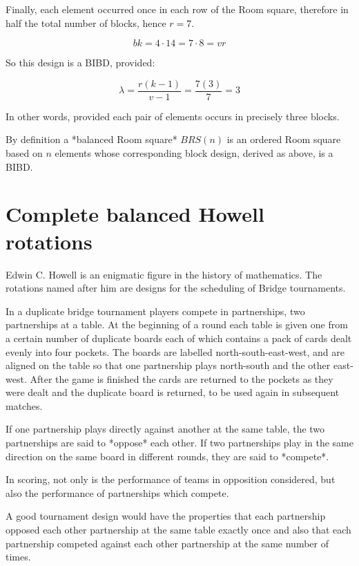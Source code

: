 \documentclass[
  11pt,
  a4paper]{book}\usepackage[]{graphicx}\usepackage[]{xcolor}
\begin{document}
Finally, each element occurred
once in each row of the Room square, therefore in half the
total number of blocks, hence $r = 7$.

\begin{equation}
bk = 4\cdot 14 = 7 \cdot 8 = vr
\end{equation}

So this design is a BIBD, provided:

\begin{equation}
\lambda = \frac{r(k - 1)}{v - 1} = \frac{7(3)}{7} = 3
\end{equation}

In other words, provided each pair of elements occurs in
precisely three blocks.

By definition a *balanced Room square* $BRS(n)$ is an
ordered Room square based on $n$ elements whose
corresponding block design, derived as above, is a BIBD.

\section{Complete balanced Howell rotations}

Edwin C. Howell is an enigmatic figure in the history of
mathematics.  The rotations named after him are designs for
the scheduling of Bridge tournaments.

In a duplicate bridge tournament players compete in
partnerships, two partnerships at a table. At the beginning
of a round each table is given one from a certain number of
duplicate boards each of which contains a pack of cards
dealt evenly into four pockets. The boards are labelled
north-south-east-west, and are aligned on the table so that
one partnership plays north-south and the other east-west.
After the game is finished the cards are returned to the
pockets as they were dealt and the duplicate board is
returned, to be used again in subsequent matches.

If one partnership plays directly against another at the
same table, the two partnerships are said to *oppose* each
other. If two partnerships play in the same direction on the
same board in different rounds, they are said to *compete*.

In scoring, not only is the performance of teams in
opposition considered, but also the performance of
partnerships which compete.

A good tournament design would have the properties that each
partnership opposed each other partnership at the same table
exactly once and also that each partnership competed against
each other partnership at the same number of times.
\end{document}
